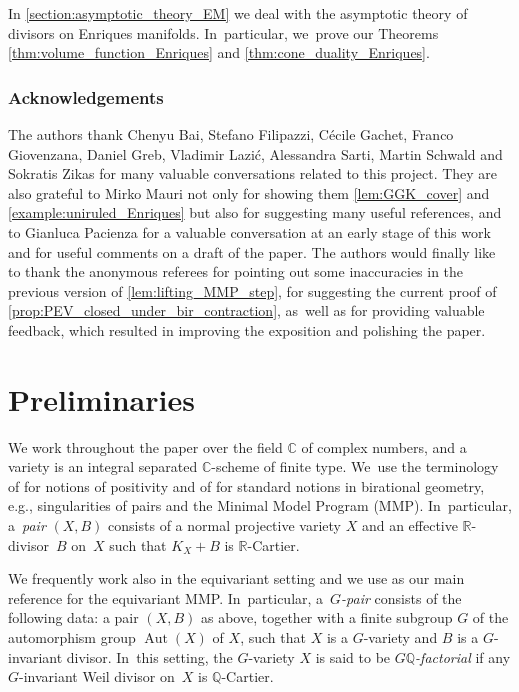 \documentclass[10pt]{amsart}
\theoremstyle{plain}
\theoremstyle{definition}
\newcommand{\Q}{\mathbb{Q}}
\newcommand{\R}{\mathbb{R}}
\newcommand{\C}{\mathbb{C}}
\DeclareMathOperator{\Aut}{Aut}
\begin{document}
In \autoref{section:asymptotic_theory_EM} we deal with the asymptotic theory of divisors on Enriques manifolds. In~particular, we~prove our Theorems \ref{thm:volume_function_Enriques} and \ref{thm:cone_duality_Enriques}.

\subsubsection*{Acknowledgements}
The authors thank Chenyu Bai, Stefano Filipazzi, Cécile \hbox{Gachet}, Franco Giovenzana, Daniel Greb, Vladimir Lazi\'c, Alessandra Sarti, Martin Schwald and Sokratis Zikas for many valuable conversations related to this project. They are also grateful to Mirko Mauri not only for showing them \autoref{lem:GGK_cover} and \autoref{example:uniruled_Enriques} but also for suggesting many useful references, and to Gianluca Pacienza for a valuable conversation at an early stage of this work and for useful comments on a draft of the paper. The authors would finally like to thank the anonymous referees for pointing out some inaccuracies in the previous version of \autoref{lem:lifting_MMP_step}, for suggesting the current proof of \autoref{prop:PEV_closed_under_bir_contraction}, as~well as for providing valuable feedback, which resulted in improving the exposition and polishing the paper.

\section{Preliminaries}
\label{section:preliminaries}

We work throughout the paper over the field $\C$ of complex numbers, and a variety is an integral separated $\C$-scheme of finite type. We~use the terminology of \cite{Laz04book_I} for notions of positivity and of \cite{KM98,Fuj17book} for standard notions in birational geometry, e.g., singularities of pairs and the Minimal Model Program (MMP). In~particular, a~\emph{pair} $(X,B)$ consists of a normal projective variety $X$ and an effective $\R$\nobreakdash-divisor~$B$ on~$X$ such that $K_X+B$ is $\R$-Cartier.

We frequently work also in the equivariant setting and we use \cite{Pro21} as our main reference for the equivariant MMP. In~particular, a~\emph{$G$\nobreakdash-pair} consists of the following data: a pair $(X,B)$ as above, together with a finite subgroup $G$ of the automorphism group $\Aut(X)$ of $X$, such that $X$ is a $G$\nobreakdash-variety and $B$ is a $G$\nobreakdash-invariant divisor. In~this setting, the $G$\nobreakdash-variety $X$ is said to be \emph{$G\Q$-factorial} if any $G$\nobreakdash-invariant Weil divisor on~$X$ is $\Q$\nobreakdash-Cartier.
\end{document}
